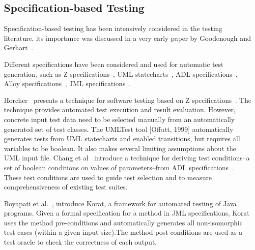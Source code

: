 

\subsection{Specification-based Testing}
\label{sec:related-specification}
Specification-based testing has been intensively considered in the testing literature.  its importance was discussed in a very early paper by Goodenough and Gerhart~\cite{Goodenough1975}.

Different specifications have been considered and used for automatic test generation, such as  Z specifications~\cite{Spivey1992,Horcher1995,Stocks1996,Donat1997}, UML statecharts~\cite{Rumbaugh1999,Offutt1999}, ADL specifications~\cite{Sankar1994,Chang1999}, Alloy specifications~\cite{Jackson2002,Khurshid2004,Coppit2005}, JML specifications~\cite{Boyapati2002}.

Horcher~\cite{Horcher1995} presents a technique for software testing based on Z specifications~\cite{Spivey1992}. The technique provides automated test execution and result evaluation. However, concrete input test data need to be selected manually from an
automatically generated set of test classes.
The UMLTest tool [Offutt, 1999] automatically generates tests from UML statecharts and enabled transitions, but requires all variables to be boolean. It also makes several limiting assumptions about the UML input file. %
Chang et al~\cite{Chang1999} introduce a technique for deriving test conditions--a set of boolean conditions on values of parameters--from ADL specifications~\cite{Sankar1994}. These test conditions are used to guide test selection and to measure comprehensiveness of existing test suites.

Boyapati et al.~\cite{Boyapati2002}, introduce Korat, a framework for automated testing of Java programs. Given a formal specification for a method in JML specifications, Korat uses the method pre-conditions and automatically generates all non-isomorphic test cases (within a given input size).The method post-conditions are used as a test oracle to check the correctness of each output.

